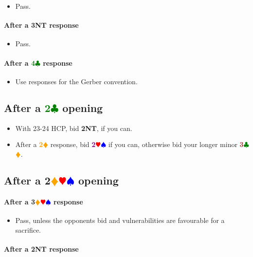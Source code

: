 \documentclass{article}
\newcommand{\Hs}{\textcolor{Red}{$\varheart$}}
\newcommand{\Ss}{\textcolor{Blue}{$\spadesuit$}}
\newcommand{\Ds}{\textcolor{Orange}{$\vardiamond$}}
\newcommand{\Cs}{\textcolor{Green}{$\clubsuit$}}
\newcommand{\NTs}{\textbf{\footnotesize{NT}}}
\newcommand{\D}[1]{\textcolor{Orange}{\textbf{#1}\Ds}}
\newcommand{\C}[1]{\textcolor{Green}{\textbf{#1}\Cs}}
\newcommand{\NT}[1]{\textbf{#1\NTs}}
\newcommand{\minors}[1]{\textcolor{Brown}{\textbf{#1}}\Cs\Ds}
\newcommand{\majors}[1]{\textcolor{Purple}{\textbf{#1}}\Hs\Ss}
\newcommand{\notclubs}[1]{\textbf{#1}\Ds\Hs\Ss}
\begin{document}
\begin{itemize}
\item Pass.
\end{itemize}

\paragraph{After a \NT{3} response}

\begin{itemize}
\item Pass.
\end{itemize}

\paragraph{After a \C{4} response} 

\begin{itemize}
\item Use responses for the Gerber convention.
\end{itemize}

\subsection{After a \C{2} opening}

\begin{itemize}
\item With 23-24 HCP, bid \NT{2}, if you can.
\item After a \D{2} response, bid \majors{2} if you can, otherwise bid your longer minor \minors{3}.
\end{itemize}

\subsection{After a \notclubs{2} opening}

\paragraph{After a \notclubs{3} response}
\begin{itemize}
\item Pass, unless the opponents bid and vulnerabilities are favourable for a sacrifice.
\end{itemize}

\paragraph{After a \NT{2} response}
\end{document}
